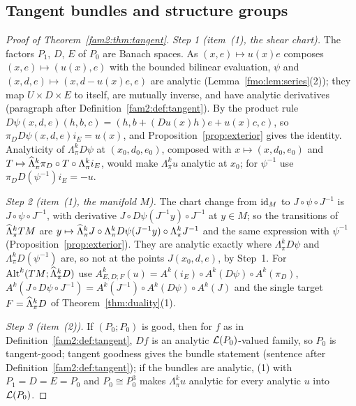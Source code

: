 \subsection{Tangent bundles and structure groups}\label{fmo:ssec:tangent}

\begin{proof}[Proof of Theorem~\ref{fam2:thm:tangent}]
\emph{Step 1 (item~(1), the shear chart).} The factors $P_1$, $D$, $E$ of $P_0$ are Banach spaces. As $(x,e)\mapsto u(x)e$
composes $(x,e)\mapsto(u(x),e)$ with the bounded bilinear evaluation, $\psi$ and $(x,d,e)\mapsto(x,d-u(x)e,e)$ are
analytic (Lemma~\ref{fmo:lem:series}(2)); they map $U\times D\times E$ to itself, are mutually inverse, and have analytic
derivatives (paragraph after Definition~\ref{fam2:def:tangent}). By the product rule $D\psi(x,d,e)(h,b,c)=(h,b+(Du(x)h)e+
u(x)c,c)$, so $\pi_DD\psi(x,d,e)i_E=u(x)$, and Proposition~\ref{prop:exterior} gives the identity. Analyticity of
$\Lambda^k_\pi D\psi$ at $(x_0,d_0,e_0)$, composed with $x\mapsto(x,d_0,e_0)$ and $T\mapsto\widehat\Lambda^k_\pi\pi_D\circ T\circ
\Lambda^k_\pi i_E$, would make $\Lambda^k_\pi u$ analytic at $x_0$; for $\psi^{-1}$ use $\pi_DD(\psi^{-1})i_E=-u$.

\emph{Step 2 (item~(1), the manifold $M$).} The chart change from $\mathrm{id}_M$ to $J\circ\psi\circ J^{-1}$ is
$J\circ\psi\circ J^{-1}$, with derivative $J\circ D\psi(J^{-1}y)\circ J^{-1}$ at $y\in M$; so the transitions of
$\widehat\Lambda^k_\pi TM$ are $y\mapsto\widehat\Lambda^k_\pi J\circ\Lambda^k_\pi D\psi(J^{-1}y)\circ\Lambda^k_\pi J^{-1}$ and the same
expression with $\psi^{-1}$ (Proposition~\ref{prop:exterior}). They are analytic exactly where $\Lambda^k_\pi D\psi$ and
$\Lambda^k_\pi D(\psi^{-1})$ are, so not at the points $J(x_0,d,e)$, by Step~1. For $\operatorname{Alt}^k(TM;\widehat\Lambda^k_\pi D)$ use
$A^k_{E,D;F}(u)=A^k(i_E)\circ A^k(D\psi)\circ A^k(\pi_D)$, $A^k(J\circ D\psi\circ J^{-1})=A^k(J^{-1})\circ A^k(D\psi)\circ
A^k(J)$ and the single target $F=\widehat\Lambda^k_\pi D$ of Theorem~\ref{thm:duality}(1).

\emph{Step 3 (item~(2)).} If $(P_0;P_0)$ is good, then for $f$ as in Definition~\ref{fam2:def:tangent}, $Df$ is an
analytic $\mathcal L(P_0)$-valued family, so $P_0$ is tangent-good; tangent goodness gives the bundle statement (sentence after
Definition~\ref{fam2:def:tangent}); if the bundles are analytic, (1) with $P_1=D=E=P_0$ and $P_0\cong P_0^3$ makes
$\Lambda^k_\pi u$ analytic for every analytic $u$ into $\mathcal L(P_0)$.


\end{proof}
